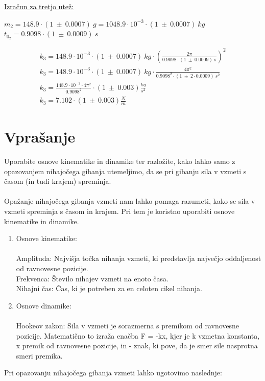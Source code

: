 \documentclass{report}
\begin{document}
\pagebreak

\noindent \underline{Izračun za tretjo utež:}

\noindent $m_2 = 148.9 \cdot (1 \ \pm \ 0.0007) \ g = 1048.9 \cdot 10^{-3} \cdot (1 \ \pm \ 0.0007) \ kg$ \\
$t_{0_2} = 0.9098 \cdot (1 \ \pm \ 0.0009) \ s$

\begin{equation}
  \label{eq:1}
  \begin{gathered}
    k_3 = 148.9 \cdot 10^{-3} \cdot (1 \ \pm \ 0.0007) \ kg \cdot \left(\frac{2 \pi}{0.9098 \cdot (1 \ \pm \ 0.0009) \ s}\right)^2 \\
    k_3 = 148.9 \cdot 10^{-3} \cdot (1 \ \pm \ 0.0007) \ kg \cdot \frac{4 {\pi}^2}{0.9098^2 \cdot (1 \ \pm \ 2 \cdot 0.0009) \ s^2} \\
    k_3 = \frac{148.9 \cdot 10^{-3} \cdot 4 {\pi}^2}{0.9098^2} \cdot (1 \ \pm \ 0.003) \frac{kg}{s^2} \\
    \boxed {k_3 = 7.102 \cdot (1 \ \pm \ 0.003) \frac{N}{m}}
  \end{gathered}
\end{equation}

\pagebreak

\section{Vprašanje}
Uporabite osnove kinematike in dinamike ter razložite, kako lahko samo z
opazovanjem nihajočega gibanja utemeljimo, da se pri gibanju sila v vzmeti s časom (in
tudi krajem) spreminja.\\\\
Opažanje nihajočega gibanja vzmeti nam lahko pomaga razumeti, kako se sila v vzmeti spreminja s časom in krajem. Pri tem je koristno uporabiti osnove kinematike in dinamike.

  \begin{enumerate}
    \item Osnove kinematike:\\\\
        Amplituda: Najvišja točka nihanja vzmeti, ki predstavlja največjo oddaljenost od ravnovesne pozicije.\\
        Frekvenca: Število nihajev vzmeti na enoto časa.\\
        Nihajni čas: Čas, ki je potreben za en celoten cikel nihanja.

    \item Osnove dinamike:\\\\
        Hookeov zakon: Sila v vzmeti je sorazmerna s premikom od ravnovesne pozicije. Matematično to izraža enačba F = -kx, kjer je k vzmetna konstanta, x premik od ravnovesne pozicije, in - znak, ki pove, da je smer sile nasprotna smeri premika.
  \end{enumerate}
Pri opazovanju nihajočega gibanja vzmeti lahko ugotovimo naslednje:
\end{document}
